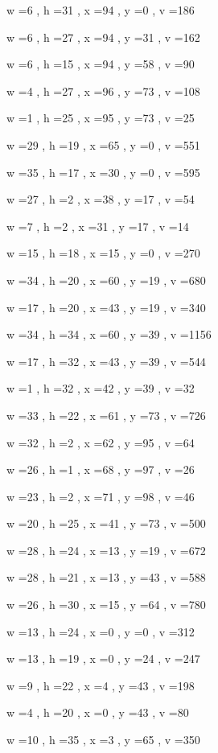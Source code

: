 \documentclass[11pt]{article}
\begin{document}
w =6 , h =31 , x =94 , y =0 , v =186
\par
w =6 , h =27 , x =94 , y =31 , v =162
\par
w =6 , h =15 , x =94 , y =58 , v =90
\par
w =4 , h =27 , x =96 , y =73 , v =108
\par
w =1 , h =25 , x =95 , y =73 , v =25
\par
w =29 , h =19 , x =65 , y =0 , v =551
\par
w =35 , h =17 , x =30 , y =0 , v =595
\par
w =27 , h =2 , x =38 , y =17 , v =54
\par
w =7 , h =2 , x =31 , y =17 , v =14
\par
w =15 , h =18 , x =15 , y =0 , v =270
\par
w =34 , h =20 , x =60 , y =19 , v =680
\par
w =17 , h =20 , x =43 , y =19 , v =340
\par
w =34 , h =34 , x =60 , y =39 , v =1156
\par
w =17 , h =32 , x =43 , y =39 , v =544
\par
w =1 , h =32 , x =42 , y =39 , v =32
\par
w =33 , h =22 , x =61 , y =73 , v =726
\par
w =32 , h =2 , x =62 , y =95 , v =64
\par
w =26 , h =1 , x =68 , y =97 , v =26
\par
w =23 , h =2 , x =71 , y =98 , v =46
\par
w =20 , h =25 , x =41 , y =73 , v =500
\par
w =28 , h =24 , x =13 , y =19 , v =672
\par
w =28 , h =21 , x =13 , y =43 , v =588
\par
w =26 , h =30 , x =15 , y =64 , v =780
\par
w =13 , h =24 , x =0 , y =0 , v =312
\par
w =13 , h =19 , x =0 , y =24 , v =247
\par
w =9 , h =22 , x =4 , y =43 , v =198
\par
w =4 , h =20 , x =0 , y =43 , v =80
\par
w =10 , h =35 , x =3 , y =65 , v =350
\par
\newpage
\end{document}
